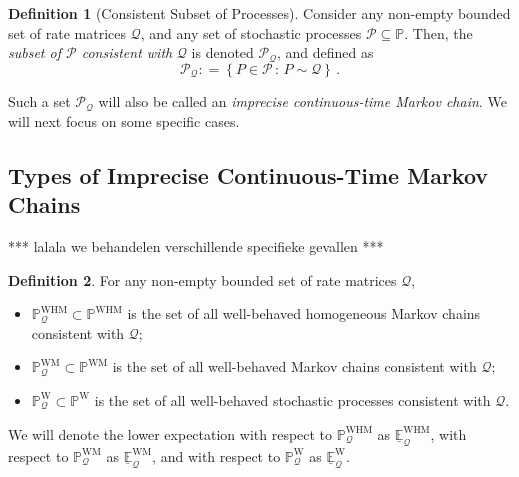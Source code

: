 \documentclass[10pt]{paper}
\theoremstyle{definition}
\newtheorem{definition}{Definition}
\newcommand{\processes}{\mathbb{P}}
\newcommand{\wprocesses}{\processes^{\mathrm{W}}}
\newcommand{\wmprocesses}{\processes^{\mathrm{WM}}}
\newcommand{\whmprocesses}{\processes^{\mathrm{WHM}}}
\newcommand{\rateset}{\mathcal{Q}}
\newcommand{\coloneqq}{:\!=}
\begin{document}

\begin{definition}[Consistent Subset of Processes]\label{def:consistent_process_set}
Consider any non-empty bounded set of rate matrices $\rateset$, and any set of stochastic processes $\mathcal{P}\subseteq\processes$. Then, the \emph{subset of $\mathcal{P}$ consistent with} $\rateset$ is denoted $\mathcal{P}_\rateset$, and defined as
\begin{equation*}
\mathcal{P}_{\rateset} \coloneqq \left\{P\in\mathcal{P}\,:\,P\sim\rateset\right\}\,.
\end{equation*}
\end{definition}
Such a set $\mathcal{P}_\rateset$ will also be called an \emph{imprecise continuous-time Markov chain}. We will next focus on some specific cases.

\subsection{Types of Imprecise Continuous-Time Markov Chains}

*** lalala we behandelen verschillende specifieke gevallen ***

\begin{definition}\label{def:process_sets}
For any non-empty bounded set of rate matrices $\rateset$,
\begin{itemize}
\item $\whmprocesses_\rateset\subset\whmprocesses$ is the set of all well-behaved homogeneous Markov chains consistent with $\rateset$;
\item $\wmprocesses_\rateset\subset\wmprocesses$ is the set of all well-behaved Markov chains consistent with $\rateset$;
\item $\wprocesses_\rateset\subset\wprocesses$ is the set of all well-behaved stochastic processes consistent with $\rateset$.
\end{itemize}
We will denote the lower expectation with respect to $\whmprocesses_\rateset$ as $\underline{\mathbb{E}}_\rateset^{\mathrm{WHM}}$, with respect to $\wmprocesses_\rateset$ as $\underline{\mathbb{E}}_\rateset^{\mathrm{WM}}$, and with respect to $\wprocesses_\rateset$ as $\underline{\mathbb{E}}_\rateset^{\mathrm{W}}$.
\end{definition}
\end{document}

